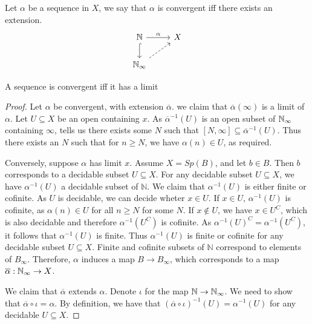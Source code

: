 \begin{definition}
  Let $\alpha$ be a sequence in $X$, we say that $\alpha$
  is convergent iff there exists an extension. 
  \begin{equation}\begin{tikzcd}
    \mathbb N \arrow[r, "\alpha"] \arrow[d,hook]  & X \\
    \Noo \arrow[ru,dashed]
  \end{tikzcd}\end{equation}  
\end{definition}  



\begin{proposition}
  A sequence is convergent iff it has a limit
\end{proposition}
\begin{proof}
  Let $\alpha$ be convergent, with extension $\overline \alpha$.
  we claim that $\overline \alpha(\infty)$ is a limit of $\alpha$.
  Let $U \subseteq X$ be an open containing $x$. 
  As $\overline\alpha^{-1}(U)$ is an open subset of $\mathbb{N}_{\infty}$ containing $\infty$,
   tells us there exists some $N$ such that $[N,\infty]\subseteq \overline \alpha^{-1}(U)$. 
  Thus there exists an $N$ such that for $n\geq N$, we have $\alpha(n) \in U$, as required. 

  Conversely, suppose $\alpha$ has limit $x$. 
  Assume $X = Sp(B)$, and let $b\in B$. Then $b$ corresponds to a decidable subset $U\subseteq X$.
  For any decidable subset $U \subseteq X$, we have 
  $\alpha^{-1}(U)$ a decidable subset of $\mathbb N$. 
  We claim that $\alpha^{-1}(U)$ is either finite or cofinite. 
  As $U$ is decidable, we can decide wheter $x\in U$. If $x\in U$, $\alpha^{-1}(U)$ is cofinite, as 
  $\alpha(n) \in U$ for all $n \geq N$ for some $N$. 
  If $x\notin U$, we have $x\in U^C$, which is also decidable and therefore $\alpha^{-1}(U^C)$ is cofinite. 
  As $\alpha^{-1}(U) ^ C = \alpha^{-1}(U^C)$, it follows that $\alpha^{-1}(U)$ is finite. 
  Thus $\alpha^{-1}(U)$ is finite or cofinite for any decidable subset $U\subseteq X$. 
  Finite and cofinite subsets of $\mathbb N$ correspond to elements of $B_\infty$. 
  Therefore, $\alpha$ induces a map $B \to B_\infty$, which corresponds to a map 
  $\overline \alpha: \mathbb{N}_{\infty} \to X$. 

  We claim that $\overline \alpha$ extends $\alpha$. 
  Denote $\iota$ for the map $\mathbb N \to \mathbb{N}_{\infty}$. 
  We need to show that $\overline \alpha \circ \iota = \alpha$. 
  By definition, we have that $(\overline \alpha \circ \iota)^{-1}(U) = \alpha^{-1}(U)$ 
  for any decidable $U\subseteq X$. 
\end{proof}


